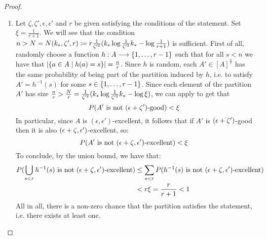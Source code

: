\begin{lemma}[Claim 5.13]
\begin{proof}
\begin{enumerate}[label=(\alph*), ref=\alph*]
            \item Let $\zeta, \zeta', \epsilon, \epsilon'$ and $r$ be given satisfying the conditions of the statement.
                Set $\xi = \frac{1}{r + 1}$.
                We will see that the condition
                $n > N = N( k_{*}, \zeta', r ) \coloneqq r \frac{1}{\zeta'^2}( k_* \log{\frac{1}{\zeta'^2}k_*} - \log{\frac{1}{r + 1}} )$
                is sufficient.
                First of all, randomly choose a function $h: A \longrightarrow \{ 1, \dots, r-1 \}$ such that
                for all $s < n$ we have that $| \{ a \in A \mid h(a) = s \} | = \frac{n}{r}$.
                Since $h$ is random, each $A' \in [A]^\frac{n}{r}$ has the same probability of being part of the partition
                induced by $h$, i.e. to satisfy $A' = h^{-1}(s)$ for some $s \in \{ 1, \dots, r-1 \}$.
                Since each element of the partition $A'$ has size
                $\frac{n}{r} > \frac{N}{r} = \frac{1}{\zeta'^2}( k_* \log{\frac{1}{\zeta'^2}k_*} - \log{\xi} )$,
                we can apply  to get that
                \[
                    P( A' \text{ is not } ( \epsilon + \zeta' )\text{-good} ) < \xi
                \]
                In particular, since $A$ is $(\epsilon, \epsilon')$-excellent, it follows  that if $A'$ is
                $( \epsilon + \zeta' )$-good then it is also $( \epsilon + \zeta, \epsilon' )$-excellent, so:
                \[
                    P( A' \text{ is not } ( \epsilon + \zeta, \epsilon' )\text{-excellent} ) < \xi
                \]
                To conclude, by the union bound, we have that:
                \begin{align*}
                    P( \bigcup_{s < r} h^{-1}(s) \text{ is not } ( \epsilon + \zeta, \epsilon' )\text{-excellent} )
                        & \leq \sum_{s < r} P( h^{-1}(s) \text{ is not } ( \epsilon + \zeta, \epsilon' )\text{-excellent} ) \\
                        & < r \xi = \frac{r}{r+1} < 1
                \end{align*}
                All in all, there is a non-zero chance that the partition satisfies the statement, i.e. there exists at least one.
        \end{enumerate}
        \end{proof}
    \end{lemma}

